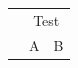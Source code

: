 \documentclass{article}
\begin{document}
\begin{tabular}{|l|c|c|}
\hline
\rowcolor{gray!15} \multicolumn{1}{|c|}{} & \multicolumn{2}{c|}{Test} \\
\rowcolor{gray!15} \multicolumn{1}{|c|}{\multirow{-2}{*}{\textbf{Kelas}}} & A & B \\
\hline
\end{tabular}
\end{document}
